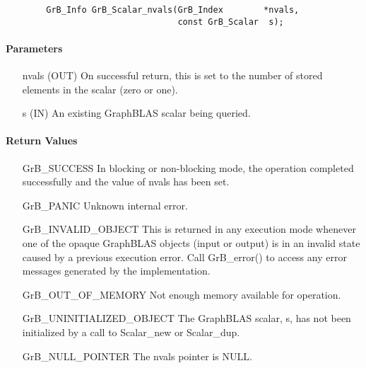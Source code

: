 \begin{verbatim}
        GrB_Info GrB_Scalar_nvals(GrB_Index        *nvals,
                                  const GrB_Scalar  s);
\end{verbatim}

\paragraph{Parameters}

\begin{itemize}[leftmargin=1.1in]
    \item[{\sf nvals}] ({\sf OUT}) On successful return, this is set to the number of 
                                   stored elements in the scalar (zero or one).
    \item[{\sf s}]     ({\sf IN})  An existing GraphBLAS scalar being queried.
\end{itemize}


\paragraph{Return Values}

\begin{itemize}[leftmargin=2.1in]
    \item[{\sf GrB\_SUCCESS}]  In blocking or non-blocking mode, the operation 
    completed successfully and the value of {\sf nvals} has been set. 

    \item[{\sf GrB\_PANIC}]    Unknown internal error.
    
    \item[{\sf GrB\_INVALID\_OBJECT}] This is returned in any execution mode 
    whenever one of the opaque GraphBLAS objects (input or output) is in an invalid 
    state caused by a previous execution error.  Call {\sf GrB\_error()} to access 
    any error messages generated by the implementation.

    \item[{\sf GrB\_OUT\_OF\_MEMORY}] Not enough memory available for operation.
    
    \item[{\sf GrB\_UNINITIALIZED\_OBJECT}]  The GraphBLAS scalar, {\sf s}, has 
    not been initialized by a call to {\sf Scalar\_new} or {\sf Scalar\_dup}.
    
    \item[{\sf GrB\_NULL\_POINTER}]  The {\sf nvals} pointer is {\sf NULL}.
\end{itemize}

